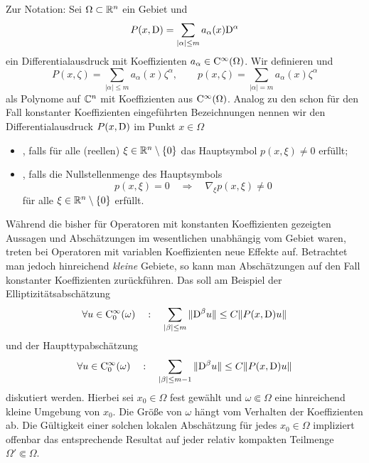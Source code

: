 Zur Notation: Sei $\Omega\subset\mathbb R^n$ ein Gebiet und 
\begin{equation}
   P(x,\mathrm D) = \sum_{|\alpha|\le m} a_\alpha(x) \mathrm D^\alpha
\end{equation}
ein Differentialausdruck mit Koeffizienten $a_\alpha\in\mathrm C^\infty(\Omega)$. Wir definieren  und 
\begin{equation}
   P(x,\zeta) = \sum_{|\alpha|\le m} a_\alpha(x)\zeta^\alpha,\qquad p(x,\zeta)=\sum_{|\alpha|=m} a_\alpha(x)\zeta^\alpha
\end{equation}
als Polynome auf $\mathbb C^n$ mit Koeffizienten aus $\mathrm C^\infty(\Omega)$. Analog zu den schon für den Fall konstanter Koeffizienten eingeführten Bezeichnungen nennen wir den Differentialausdruck $P(x,\mathrm D)$ im Punkt $x\in\Omega$
\begin{itemize}
\item {}, falls für alle (reellen) $\xi\in\mathbb R^n\setminus\{0\}$ das Hauptsymbol $p(x,\xi)\ne0$ erfüllt;
\item {}, falls die Nullstellenmenge des Hauptsymbols 
\begin{equation}
    p(x,\xi) = 0 \quad \Longrightarrow \quad \nabla_\xi p(x,\xi)\ne0
\end{equation}
für alle $\xi\in\mathbb R^n\setminus\{0\}$ erfüllt.
\end{itemize}
Während die bisher für Operatoren mit konstanten Koeffizienten gezeigten Aussagen und Abschätzungen im wesentlichen unabhängig vom Gebiet waren, 
treten bei Operatoren mit variablen Koeffizienten neue Effekte auf. Betrachtet man jedoch hinreichend {\em kleine} Gebiete, so kann man Abschätzungen auf den Fall konstanter Koeffizienten zurückführen. Das soll am Beispiel der Elliptizitätsabschätzung
\begin{equation}\label{eq:4:locEll}
\forall u\in\mathrm C_0^\infty(\omega)\quad:\quad      \sum_{|\beta|\le m} \| \mathrm D^\beta u\| \le C \| P(x,\mathrm D) u \|
\end{equation}
und der Haupttypabschätzung 
\begin{equation}\label{eq:4:locHT}
\forall u\in\mathrm C_0^\infty(\omega)\quad:\quad      \sum_{|\beta|\le m-1} \| \mathrm D^\beta u\| \le C \| P(x,\mathrm D) u \|
\end{equation}
diskutiert werden. Hierbei sei $x_0\in\Omega$ fest gewählt und $\omega\Subset\Omega$ eine hinreichend kleine Umgebung von $x_0$. Die Größe von $\omega$ hängt vom Verhalten der Koeffizienten ab. Die Gültigkeit einer solchen lokalen Abschätzung für jedes $x_0\in\Omega$ impliziert offenbar das entsprechende Resultat auf jeder relativ kompakten Teilmenge $\Omega'\Subset\Omega$.

